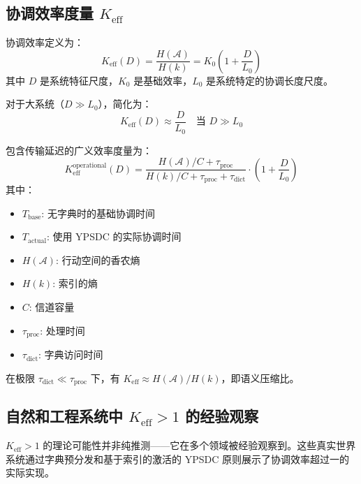 \documentclass[11pt,a4paper]{article}
\begin{document}
	\subsection{协调效率度量 \texorpdfstring{$K_{\mathrm{eff}}$}{K_eff}}
	协调效率定义为：
	\begin{equation}
		K_{\mathrm{eff}}(D) = \frac{H(\mathcal{A})}{H(k)} = K_0 \left(1 + \frac{D}{L_0}\right)
	\end{equation}
	其中 $D$ 是系统特征尺度，$K_0$ 是基础效率，$L_0$ 是系统特定的协调长度尺度。
	
	对于大系统（$D \gg L_0$），简化为：
	\begin{equation}
		K_{\mathrm{eff}}(D) \approx \frac{D}{L_0} \quad \text{当 } D \gg L_0
	\end{equation}
	
	包含传输延迟的广义效率度量为：
	\begin{equation}
		K_{\mathrm{eff}}^{\text{operational}}(D) = \frac{H(\mathcal{A})/C + \tau_{\text{proc}}}{H(k)/C + \tau_{\text{proc}} + \tau_{\text{dict}}} \cdot \left(1 + \frac{D}{L_0}\right)
	\end{equation}
	其中：
	\begin{itemize}
		\item $T_{\text{base}}$: 无字典时的基础协调时间
		\item $T_{\text{actual}}$: 使用 YPSDC 的实际协调时间
		\item $H(\mathcal{A})$: 行动空间的香农熵
		\item $H(k)$: 索引的熵
		\item $C$: 信道容量
		\item $\tau_{\text{proc}}$: 处理时间
		\item $\tau_{\text{dict}}$: 字典访问时间
	\end{itemize}
	
	在极限 $\tau_{\text{dict}} \ll \tau_{\text{proc}}$ 下，有 $K_{\mathrm{eff}} \approx H(\mathcal{A})/H(k)$，即语义压缩比。
	
	\subsection{自然和工程系统中 $K_{\mathrm{eff}} > 1$ 的经验观察}
	\label{sec:empirical-keff}
	
	$K_{\mathrm{eff}} > 1$ 的理论可能性并非纯推测——它在多个领域被经验观察到。这些真实世界系统通过字典预分发和基于索引的激活的 YPSDC 原则展示了协调效率超过一的实际实现。
	
\end{document}
